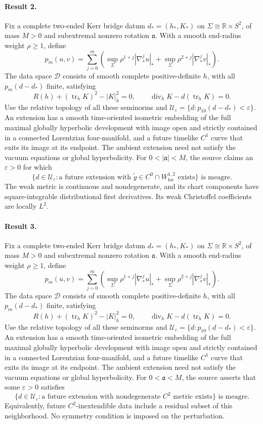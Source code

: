 \documentclass[11pt]{article}
\begin{document}
\paragraph{Result 2.} Fix a complete two-ended Kerr bridge datum \(d_*=(h_*,K_*)\) on \(\Sigma\cong\mathbb R\times S^2\), of mass \(M>0\) and subextremal nonzero rotation \(\mathfrak a\). With a smooth end-radius weight \(\rho\ge1\), define
\[
 p_m(u,v)=\sum_{j=0}^m\left(\sup_\Sigma\rho^{1+j}|\nabla_*^ju|_*+
 \sup_\Sigma\rho^{2+j}|\nabla_*^jv|_*\right).
\]
The data space \(\mathcal D\) consists of smooth complete positive-definite \(h\), with all \(p_m(d-d_*)\) finite, satisfying
\[
 R(h)+(\operatorname{tr}_hK)^2-|K|_h^2=0,\qquad
 \operatorname{div}_hK-d(\operatorname{tr}_hK)=0.
\]
Use the relative topology of all these seminorms and \(\mathcal U_\varepsilon=\{d:p_{10}(d-d_*)<\varepsilon\}\). An extension has a smooth time-oriented isometric embedding of the full maximal globally hyperbolic development with image open and strictly contained in a connected Lorentzian four-manifold, and a future timelike \(C^1\) curve that exits its image at its endpoint. The ambient extension need not satisfy the vacuum equations or global hyperbolicity. For \(0<|\mathfrak a|<M\), the source claims an \(\varepsilon>0\) for which
\[
 \{d\in\mathcal U_\varepsilon:\text{a future extension with }\widetilde g\in C^0\cap W^{1,2}_{\mathrm{loc}}\text{ exists}\}
 \text{ is meagre}.
\]
The weak metric is continuous and nondegenerate, and its chart components have square-integrable distributional first derivatives. Its weak Christoffel coefficients are locally \(L^2\).

\paragraph{Result 3.} Fix a complete two-ended Kerr bridge datum \(d_*=(h_*,K_*)\) on \(\Sigma\cong\mathbb R\times S^2\), of mass \(M>0\) and subextremal nonzero rotation \(\mathfrak a\). With a smooth end-radius weight \(\rho\ge1\), define
\[
 p_m(u,v)=\sum_{j=0}^m\left(\sup_\Sigma\rho^{1+j}|\nabla_*^ju|_*+
 \sup_\Sigma\rho^{2+j}|\nabla_*^jv|_*\right).
\]
The data space \(\mathcal D\) consists of smooth complete positive-definite \(h\), with all \(p_m(d-d_*)\) finite, satisfying
\[
 R(h)+(\operatorname{tr}_hK)^2-|K|_h^2=0,\qquad
 \operatorname{div}_hK-d(\operatorname{tr}_hK)=0.
\]
Use the relative topology of all these seminorms and \(\mathcal U_\varepsilon=\{d:p_{10}(d-d_*)<\varepsilon\}\). An extension has a smooth time-oriented isometric embedding of the full maximal globally hyperbolic development with image open and strictly contained in a connected Lorentzian four-manifold, and a future timelike \(C^1\) curve that exits its image at its endpoint. The ambient extension need not satisfy the vacuum equations or global hyperbolicity. For \(0<\mathfrak a<M\), the source asserts that some \(\varepsilon>0\) satisfies
\[
 \{d\in\mathcal U_\varepsilon:\text{a future extension with nondegenerate }C^2\text{ metric exists}\}
 \text{ is meagre}.
\]
Equivalently, future \(C^2\)-inextendible data include a residual subset of this neighborhood. No symmetry condition is imposed on the perturbation.
\end{document}
